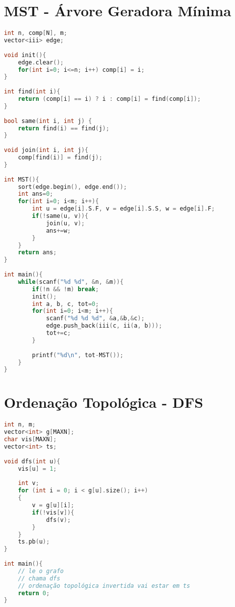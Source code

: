 \documentclass[12pt,a4paper,twoside]{report}
\begin{document}
\section{MST - Árvore Geradora Mínima}
\noindent\begin{lstlisting}[caption=MST - Árvore Geradora Mínima,language=C++]
int n, comp[N], m;
vector<iii> edge;
 
void init(){
    edge.clear();
    for(int i=0; i<=n; i++) comp[i] = i;
}
 
int find(int i){
    return (comp[i] == i) ? i : comp[i] = find(comp[i]);
}
 
bool same(int i, int j) {
    return find(i) == find(j);
}
 
void join(int i, int j){
    comp[find(i)] = find(j);
}
 
int MST(){
    sort(edge.begin(), edge.end());
    int ans=0;
    for(int i=0; i<m; i++){
        int u = edge[i].S.F, v = edge[i].S.S, w = edge[i].F;
        if(!same(u, v)){
            join(u, v);
            ans+=w;
        }
    }
    return ans;
}
 
int main(){
    while(scanf("%d %d", &n, &m)){
        if(!n && !m) break;
        init();
        int a, b, c, tot=0;
        for(int i=0; i<m; i++){
            scanf("%d %d %d", &a,&b,&c);
            edge.push_back(iii(c, ii(a, b)));
            tot+=c;
        }
         
        printf("%d\n", tot-MST());
    }     
}
\end{lstlisting}

\section{Ordenação Topológica - DFS}
\noindent\begin{lstlisting}[caption=Ordenação Topológica - DFS,language=C++]
int n, m;
vector<int> g[MAXN];
char vis[MAXN];
vector<int> ts;
 
void dfs(int u){
    vis[u] = 1;
     
    int v;
    for (int i = 0; i < g[u].size(); i++)
    {
        v = g[u][i];
        if(!vis[v]){
            dfs(v);
        }
    }
    ts.pb(u);
}
 
int main(){
    // le o grafo
    // chama dfs
    // ordenação topológica invertida vai estar em ts  
    return 0;
}
\end{lstlisting}
\end{document}
